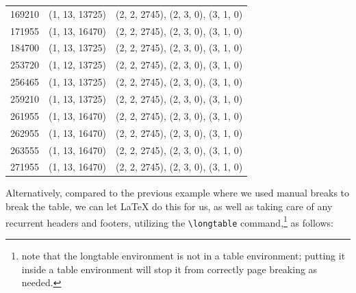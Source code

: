 \documentclass[../main.tex]{subfiles}
\begin{document}
\begin{table}[h!t!]
\begin{tabularx}{6.5 in}{r l X}
169210 & (1, 13, 13725) & (2, 2, 2745), (2, 3, 0), (3, 1, 0) \\
171955 & (1, 13, 16470) & (2, 2, 2745), (2, 3, 0), (3, 1, 0) \\
184700 & (1, 13, 13725) & (2, 2, 2745), (2, 3, 0), (3, 1, 0) \\
253720 & (1, 12, 13725) & (2, 2, 2745), (2, 3, 0), (3, 1, 0) \\
256465 & (1, 13, 13725) & (2, 2, 2745), (2, 3, 0), (3, 1, 0) \\
259210 & (1, 13, 13725) & (2, 2, 2745), (2, 3, 0), (3, 1, 0) \\
261955 & (1, 13, 16470) & (2, 2, 2745), (2, 3, 0), (3, 1, 0) \\
262955 & (1, 13, 16470) & (2, 2, 2745), (2, 3, 0), (3, 1, 0) \\
263555 & (1, 13, 16470) & (2, 2, 2745), (2, 3, 0), (3, 1, 0) \\
271955 & (1, 13, 16470) & (2, 2, 2745), (2, 3, 0), (3, 1, 0) \\

\hline
\end{tabularx}
\end{table}

Alternatively, compared to the previous example where we used manual breaks to break the table, we can let LaTeX do this for us, as well as taking care of any recurrent headers and footers, utilizing the \verb|\longtable| command,\footnote{note that the longtable environment is not in a table environment; putting it inside a table environment will stop it from correctly page breaking as needed.} as follows:

\clearpage
\end{document}
